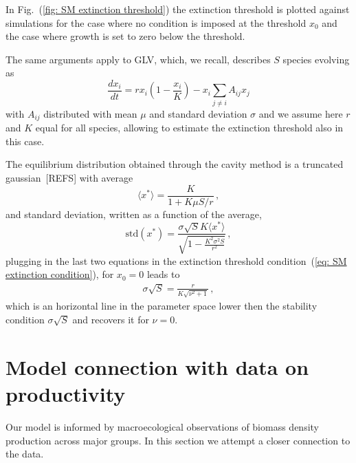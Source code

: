 \documentclass[10pt]{article}
\begin{document}
In Fig.~(\ref{fig: SM extinction threshold}) the extinction threshold
is plotted against simulations for the case where no condition is imposed
at the threshold $x_0$ and the case where growth is set to zero below the threshold.

The same arguments apply to GLV, which, we recall, describes $S$ species evolving as
\begin{equation}
    \frac{dx_i}{dt} = r x_i(1-\frac{x_i}{K}) - x_i\sum_{j\neq i}A_{ij}x_j
\end{equation}
with $A_{ij}$ distributed with mean $\mu$ and standard deviation $\sigma$
and we assume here $r$ and $K$ equal for all species,
allowing to estimate the extinction threshold also in this case.

The equilibrium distribution obtained through the cavity method is
a truncated gaussian~[REFS] with average
\begin{equation}
    \langle x^* \rangle = \frac{K}{1+K\mu S/r} \, ,
\end{equation}
and standard deviation, written as a function of the average,
\begin{equation}
    \textrm{std}(x^*) = \frac{\sigma\sqrt{S}K\langle x^* \rangle}{\sqrt{1-\frac{K^2\sigma^2S}{r^2}}} \, ,
\end{equation}
plugging in the last two equations in the extinction 
threshold condition~(\ref{eq: SM extinction condition}), for $x_0=0$
leads to 
\begin{eqnarray}
    \sigma\sqrt{S} = \frac{r}{K\sqrt{\nu^2+1}} \, ,
\end{eqnarray}
which is an horizontal line in the parameter space 
lower then the stability condition $\sigma\sqrt{S}$ and recovers it for $\nu=0$.


\section{Model connection with data on productivity}
Our model is informed by macroecological observations
of biomass density production across major groups.
In this section we attempt a closer connection to the data.
\end{document}
